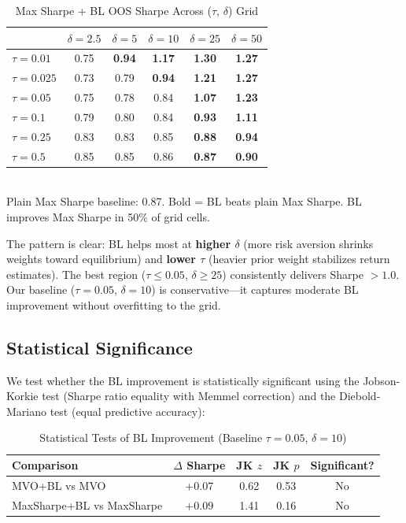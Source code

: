 \documentclass[12pt,a4paper]{article}
\begin{document}
\begin{table}[H]
\centering
\caption{Max Sharpe + BL OOS Sharpe Across ($\tau$, $\delta$) Grid}
\label{tab:bl_grid_ms}
\small
\begin{tabular}{lccccc}
\toprule
 & $\delta=2.5$ & $\delta=5$ & $\delta=10$ & $\delta=25$ & $\delta=50$ \\
\midrule
$\tau=0.01$  & 0.75 & \textbf{0.94} & \textbf{1.17} & \textbf{1.30} & \textbf{1.27} \\
$\tau=0.025$ & 0.73 & 0.79 & \textbf{0.94} & \textbf{1.21} & \textbf{1.27} \\
$\tau=0.05$  & 0.75 & 0.78 & 0.84 & \textbf{1.07} & \textbf{1.23} \\
$\tau=0.1$   & 0.79 & 0.80 & 0.84 & \textbf{0.93} & \textbf{1.11} \\
$\tau=0.25$  & 0.83 & 0.83 & 0.85 & \textbf{0.88} & \textbf{0.94} \\
$\tau=0.5$   & 0.85 & 0.85 & 0.86 & \textbf{0.87} & \textbf{0.90} \\
\bottomrule
\end{tabular}
\\[0.3em]
\small Plain Max Sharpe baseline: 0.87. Bold = BL beats plain Max Sharpe. BL improves Max Sharpe in 50\% of grid cells.
\end{table}

The pattern is clear: BL helps most at \textbf{higher $\delta$} (more risk aversion shrinks weights toward equilibrium) and \textbf{lower $\tau$} (heavier prior weight stabilizes return estimates). The best region ($\tau \leq 0.05$, $\delta \geq 25$) consistently delivers Sharpe $> 1.0$. Our baseline ($\tau = 0.05$, $\delta = 10$) is conservative---it captures moderate BL improvement without overfitting to the grid.

\subsection{Statistical Significance}

We test whether the BL improvement is statistically significant using the Jobson-Korkie test (Sharpe ratio equality with Memmel correction) and the Diebold-Mariano test (equal predictive accuracy):

\begin{table}[H]
\centering
\caption{Statistical Tests of BL Improvement (Baseline $\tau=0.05$, $\delta=10$)}
\label{tab:bl_tests}
\small
\begin{tabular}{lcccc}
\toprule
\textbf{Comparison} & \textbf{$\Delta$ Sharpe} & \textbf{JK $z$} & \textbf{JK $p$} & \textbf{Significant?} \\
\midrule
MVO+BL vs MVO             & +0.07 & 0.62 & 0.53 & No \\
MaxSharpe+BL vs MaxSharpe & +0.09 & 1.41 & 0.16 & No \\
\bottomrule
\end{tabular}
\end{table}
\end{document}
